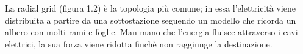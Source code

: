 \begin{figure}[h]
\end{figure}

La radial grid (figura 1.2) è la topologia più comune; in essa l'elettricità viene distribuita a partire da una sottostazione seguendo un modello che ricorda un albero con molti rami e foglie.
Man mano che l'energia fluisce attraverso i cavi elettrici, la sua forza viene ridotta finchè non raggiunge la destinazione.

